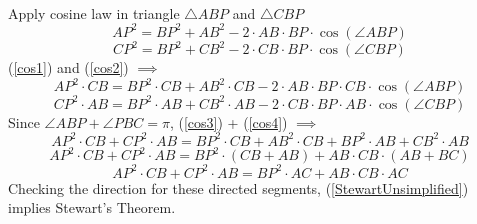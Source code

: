 \documentclass{article}
\begin{document}
\\
Apply cosine law in triangle $\triangle ABP$ and $\triangle CBP$ \\
\begin{equation}
\label{cos1}
AP^2 = BP^2+AB^2-2\cdot AB \cdot BP \cdot \cos(\angle ABP)
\end{equation}
\begin{equation}
\label{cos2}
CP^2 = BP^2+CB^2-2\cdot CB \cdot BP \cdot \cos(\angle CBP)
\end{equation}
(\ref{cos1}) and (\ref{cos2}) $\implies$ \\
\begin{equation}
\label{cos3}
AP^2\cdot CB = BP^2 \cdot CB +AB^2 \cdot CB -2\cdot AB \cdot BP \cdot CB \cdot \cos(\angle ABP)
\end{equation}
\begin{equation}
\label{cos4}
CP^2 \cdot AB = BP^2 \cdot AB +CB^2 \cdot AB -2\cdot CB \cdot BP \cdot  AB \cdot \cos(\angle CBP)
\end{equation}
Since $\angle ABP + \angle PBC = \pi$, (\ref{cos3}) + (\ref{cos4}) $\implies$
\begin{equation}
AP^2\cdot CB + CP^2 \cdot AB = BP^2 \cdot CB +AB^2 \cdot CB + BP^2 \cdot AB +CB^2 \cdot AB
\end{equation}
\begin{equation}
AP^2\cdot CB + CP^2 \cdot AB = BP^2 \cdot (CB+AB) +AB \cdot CB \cdot (AB+BC)
\end{equation}
\begin{equation}
\label{StewartUnsimplified}
AP^2\cdot CB + CP^2 \cdot AB = BP^2 \cdot AC +AB \cdot CB \cdot AC
\end{equation}
Checking the direction for these directed segments, (\ref{StewartUnsimplified}) implies Stewart’s Theorem.
\pagebreak
\end{document}
